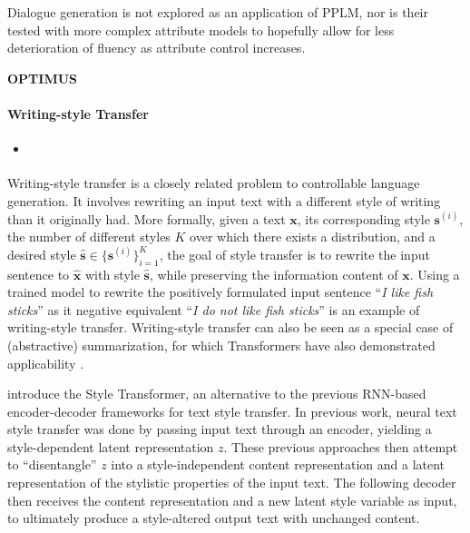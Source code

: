 Dialogue generation is not explored as an application of PPLM, nor is their tested with more complex attribute models to hopefully allow for less deterioration of fluency as attribute control increases.

\textbf{OPTIMUS}

\paragraph{Writing-style Transfer}
\begin{itemize}
    \item \cite{dai2019style}
\end{itemize}

Writing-style transfer is a closely related problem to controllable language generation. It involves rewriting an input text with a different style of writing than it originally had. More formally, given a text $\textbf{x}$, its corresponding style $\textbf{s}^{(i)}$, the number of different styles $K$ over which there exists a distribution, and a desired style $\hat{\textbf{s}} \in \{\textbf{s}^{(i)}\}_{i = 1}^{K}$, the goal of style transfer is to rewrite the input sentence to $\hat{\textbf{x}}$ with style $\hat{\textbf{s}}$, while preserving the information content of $\textbf{x}$. Using a trained model to rewrite the positively formulated input sentence ``\textit{I like fish sticks}'' as it negative equivalent ``\textit{I do not like fish sticks}'' is an example of writing-style transfer. Writing-style transfer can also be seen as a special case of (abstractive) summarization, for which Transformers have also demonstrated applicability \citep{baan-etal-2019-abstractive}.

\cite{dai-etal-2019-style} introduce the Style Transformer, an alternative to the previous RNN-based encoder-decoder frameworks for text style transfer. In previous work, neural text style transfer was done by passing input text through an encoder, yielding a style-dependent latent representation $z$. These previous approaches then attempt to ``disentangle'' $z$ into a style-independent content representation and a latent representation of the stylistic properties of the input text. The following decoder then receives the content representation and a new latent style variable as input, to ultimately produce a style-altered output text with unchanged content.


